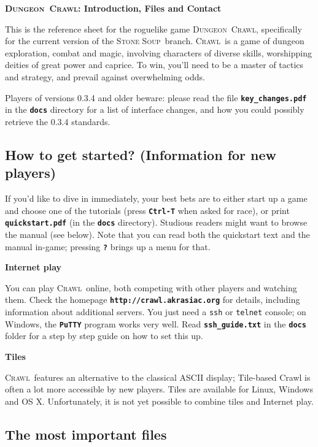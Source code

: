 \documentclass[a4paper,10pt]{article}
\newcommand{\key}[1]{{{\texttt{\textbf{#1}}}}} %
\newcommand{\sex}[1]{{{\textbf{#1}}}} %
\newcommand{\crawl}{\textsc{Crawl}}
\newcommand{\dungeon}{\textsc{Dungeon}}
\newcommand{\soup}{\textsc{Stone Soup}}
\newcommand{\para}{\vspace{1.5ex}}
\begin{document}
\begin{center}\textbf{\LARGE
\dungeon\ \crawl: Introduction, Files  and Contact
}\end{center}

This is the reference sheet for the roguelike game \dungeon\ \crawl,
specifically for the current version of the \soup\ branch. 
\crawl\ is a game of dungeon exploration, combat and magic, involving
characters of diverse skills, worshipping deities of great power and
caprice. To win, you'll need to be a master of tactics and strategy,
and prevail against overwhelming odds.

\para

Players of versions 0.3.4 and older beware: please read the file 
\key{key\_changes.pdf} in the \key{docs} directory for a list of
interface changes, and how you could possibly retrieve the 0.3.4
standards.

\subsection*{How to get started? (Information for new players)}

If you'd like to dive in immediately, your best bets are to either
start up a game and choose one of the tutorials (press \key{Ctrl-T} 
when asked for race), or print \key{quickstart.pdf} (in the \key{docs} 
directory). Studious readers might want to browse the manual  (see 
below). Note that you can read both the quickstart text and the
manual in-game; pressing \key{?} brings up a menu for that.

\para

\sex{Internet play}

You can play \crawl\ online, both competing with other players and watching 
them. Check the homepage \key{http://crawl.akrasiac.org} for details, including 
information about additional servers. You just need a \texttt{ssh} or 
\texttt{telnet} console; on Windows, the \key{PuTTY} program works very 
well. Read \key{ssh\_guide.txt} in the \key{docs} folder for a step by step 
guide on how to set this up.

\para 

\sex{Tiles}

\crawl\ features an alternative to the classical ASCII display; Tile-based
Crawl is often a lot more accessible by new players. Tiles are available for 
Linux, Windows and OS X.
Unfortunately, it is not yet possible to combine tiles and Internet play.

\subsection*{The most important files}
\end{document}
